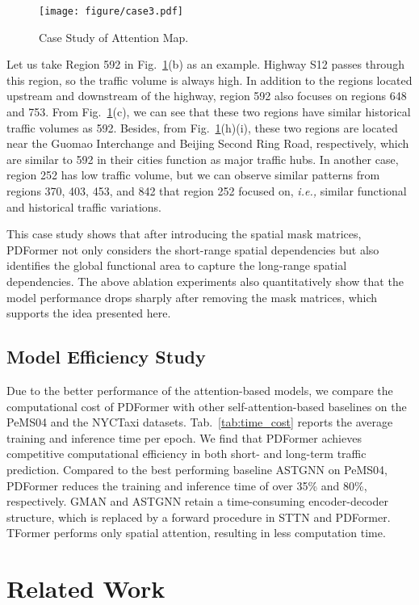 \documentclass[letterpaper]{article} \usepackage{aaai23}  \usepackage{times}  \usepackage{helvet}  \usepackage{courier}  \usepackage[hyphens]{url}  \usepackage{graphicx} \urlstyle{rm} \def\UrlFont{\rm}  \usepackage{natbib}  \usepackage{caption} \frenchspacing  \setlength{\pdfpagewidth}{8.5in} \setlength{\pdfpageheight}{11in} \usepackage{algorithm}
\newcommand{\name}{PDFormer\xspace}
\newcommand{\ie}{\emph{i.e.,}\xspace}
\newcommand{\pfour}{PeMS04\xspace}
\newcommand{\taxi}{NYCTaxi\xspace}
\begin{document}
\begin{figure}[t]
    \centering
    \texttt{[image: figure/case3.pdf]}
    \caption{Case Study of Attention Map.}
    \label{fig:case1}
\end{figure}



Let us take Region 592 in Fig.~\ref{fig:case1}(b) as an example. Highway S12 passes through this region, so the traffic volume is always high. In addition to the regions located upstream and downstream of the highway, region 592 also focuses on regions 648 and 753. From Fig.~\ref{fig:case1}(c), we can see that these two regions have similar historical traffic volumes as 592. Besides, from Fig.~\ref{fig:case1}(h)(i), these two regions are located near the Guomao Interchange and Beijing Second Ring Road, respectively, which are similar to 592 in their cities function as major traffic hubs. In another case, region 252 has low traffic volume, but we can observe similar patterns from regions 370, 403, 453, and 842 that region 252 focused on, \ie similar functional and historical traffic variations.

This case study shows that after introducing the spatial mask matrices, \name not only considers the short-range spatial dependencies but also identifies the global functional area to capture the long-range spatial dependencies. The above ablation experiments also quantitatively show that the model performance drops sharply after removing the mask matrices, which supports the idea presented here.

\subsection{Model Efficiency Study}
Due to the better performance of the attention-based models, we compare the computational cost of \name with other self-attention-based baselines on the \pfour and the \taxi datasets. Tab.~\ref{tab:time_cost} reports the average training and inference time per epoch. We find that \name achieves competitive computational efficiency in both short- and long-term traffic prediction. Compared to the best performing baseline ASTGNN on \pfour, \name reduces the training and inference time of over 35\% and 80\%, respectively. GMAN and ASTGNN retain a time-consuming encoder-decoder structure, which is replaced by a forward procedure in STTN and \name. TFormer performs only spatial attention, resulting in less computation time.

\section{Related Work}
\end{document}
